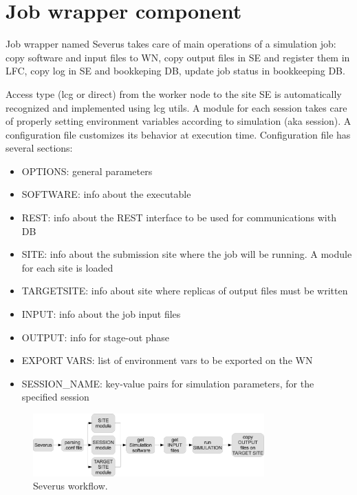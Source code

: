 \documentclass[journal]{IEEEtran}
\begin{document}
\section{Job wrapper component}
\label{sec:severus}

Job wrapper named Severus takes care of main operations of a simulation job: copy software and input files to WN, copy output files in SE and register them in LFC, copy log in SE and bookkeping DB, update job status in bookkeeping DB.

Access type (lcg or direct) from the worker node to the site SE is automatically recognized and implemented using lcg utils.
A module for each session takes care of properly setting environment variables according to simulation (aka session).
A configuration file customizes its behavior at execution time.
Configuration file has several sections:
\begin{itemize}
\item OPTIONS: general parameters
\item SOFTWARE: info about the executable
\item REST: info about the REST interface to be used for communications with DB
\item SITE: info about the submission site where the job will be running. A module for each site is loaded
\item TARGETSITE:  info about site where replicas of output files must be written
\item INPUT: info about the job input files
\item OUTPUT: info for stage-out phase
\item EXPORT VARS: list of environment vars to be exported on the WN
\item SESSION\_NAME: key-value pairs for simulation parameters, for the specified session
\end{itemize}

\begin{figure}[!h]
\centering
\includegraphics[width=3.5in]{severus_workflow.eps}
\caption{Severus workflow.}
\label{fig:severus_workflow}
\end{figure}
\end{document}
